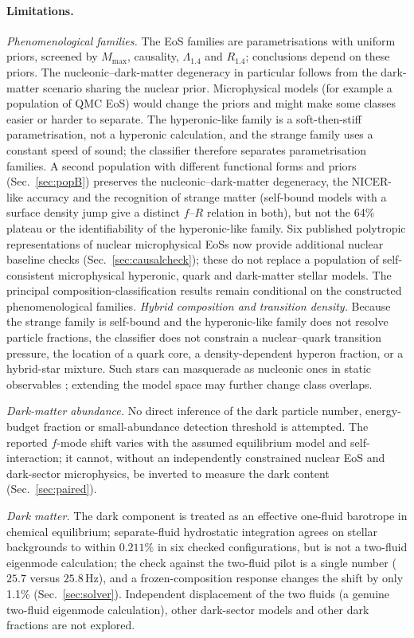 \documentclass[11pt,a4paper]{article}
\begin{document}
\paragraph{Limitations.}
\emph{Phenomenological families.} The EoS families are parametrisations with uniform priors, screened by $M_{\max}$, causality, $\Lambda_{1.4}$ and $R_{1.4}$; conclusions depend on these priors. The nucleonic--dark-matter degeneracy in particular follows from the dark-matter scenario sharing the nuclear prior. Microphysical models (for example a population of QMC EoS) would change the priors and might make some classes easier or harder to separate. The hyperonic-like family is a soft-then-stiff parametrisation, not a hyperonic calculation, and the strange family uses a constant speed of sound; the classifier therefore separates parametrisation families. A second population with different functional forms and priors (Sec.~\ref{sec:popB}) preserves the nucleonic--dark-matter degeneracy, the NICER-like accuracy and the recognition of strange matter (self-bound models with a surface density jump give a distinct $f$--$R$ relation in both), but not the 64\% plateau or the identifiability of the hyperonic-like family. Six published polytropic representations of nuclear microphysical EoSs now provide additional nuclear baseline checks (Sec.~\ref{sec:causalcheck}); these do not replace a population of self-consistent microphysical hyperonic, quark and dark-matter stellar models. The principal composition-classification results remain conditional on the constructed phenomenological families.
\emph{Hybrid composition and transition density.} Because the strange family is self-bound and the hyperonic-like family does not resolve particle fractions, the classifier does not constrain a nuclear--quark transition pressure, the location of a quark core, a density-dependent hyperon fraction, or a hybrid-star mixture. Such stars can masquerade as nucleonic ones in static observables \citep{Alford05}; extending the model space may further change class overlaps. \par
\emph{Dark-matter abundance.} No direct inference of the dark particle number, energy-budget fraction or small-abundance detection threshold is attempted. The reported $f$-mode shift varies with the assumed equilibrium model and self-interaction; it cannot, without an independently constrained nuclear EoS and dark-sector microphysics, be inverted to measure the dark content (Sec.~\ref{sec:paired}). \par
\emph{Dark matter.} The dark component is treated as an effective one-fluid barotrope in chemical equilibrium; separate-fluid hydrostatic integration agrees on stellar backgrounds to within $0.211\%$ in six checked configurations, but is not a two-fluid eigenmode calculation; the check against the two-fluid pilot is a single number ($25.7$ versus $25.8$\,Hz), and a frozen-composition response changes the shift by only 1.1\% (Sec.~\ref{sec:solver}). Independent displacement of the two fluids (a genuine two-fluid eigenmode calculation), other dark-sector models and other dark fractions are not explored.
\end{document}
